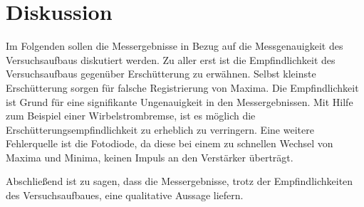 \section{Diskussion}
Im Folgenden sollen die Messergebnisse in Bezug auf die Messgenauigkeit des
Versuchsaufbaus diskutiert werden.
Zu aller erst ist die Empfindlichkeit des Versuchsaufbaus gegenüber Erschütterung
zu erwähnen. Selbst kleinste Erschütterung sorgen für falsche Registrierung von
Maxima. Die Empfindlichkeit ist Grund für eine signifikante Ungenauigkeit in den
Messergebnissen. Mit Hilfe zum Beispiel einer Wirbelstrombremse, ist es möglich die
Erschütterungsempfindlichkeit zu erheblich zu verringern.
Eine weitere Fehlerquelle ist die Fotodiode, da diese bei einem zu schnellen
Wechsel von Maxima und Minima, keinen Impuls an den Verstärker überträgt.

Abschließend ist zu sagen, dass die Messergebnisse, trotz der Empfindlichkeiten
des Versuchsaufbaues, eine qualitative Aussage liefern.
